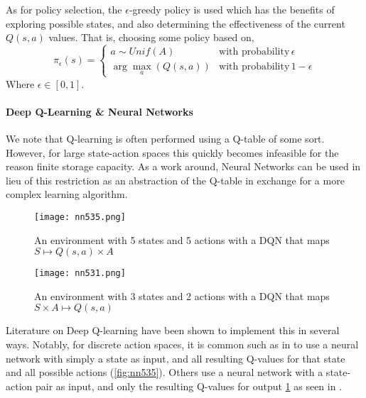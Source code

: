 \documentclass[../report.tex]{subfiles}
\begin{document}
As for policy selection, the $\epsilon$-greedy policy is used which has the benefits of exploring possible states, and also determining the effectiveness of the current $Q(s,a)$ values. That is, choosing some policy based on,
\begin{equation}\label{eq:epsilon-greedy}
    \pi_\epsilon(s)=
    \begin{cases}
        a \sim Unif(A)      & \text{with probability}\, \epsilon \\ 
        \arg\max\limits_{a}(Q(s,a))         & \text{with probability} \, 1-\epsilon
    \end{cases}
\end{equation}
Where $\epsilon\in[0,1]$.

\paragraph{Deep Q-Learning \& Neural Networks}
We note that Q-learning is often performed using a Q-table of some sort. However, for large state-action spaces this quickly becomes infeasible for the reason finite storage capacity. As a work around, Neural Networks can be used in lieu of this restriction as an abstraction of the Q-table in exchange for a more complex learning algorithm.

\begin{figure}
    \centering
    \begin{minipage}{0.35\textwidth}\label{fig:nn535}
        \centering
        \texttt{[image: nn535.png]}
        \caption{An environment with 5 states and 5 actions with a DQN that maps $S \mapsto Q(s,a) \times A$ }
    \end{minipage}\hfill
    \begin{minipage}{0.35\textwidth}\label{fig:nn531}
        \centering
        \texttt{[image: nn531.png]}
        \caption{An environment with 3 states and 2 actions with a DQN that maps $S\times A \mapsto Q(s,a)$ }
    \end{minipage}
\end{figure}

Literature on Deep Q-learning have been shown to implement this in several ways. Notably, for discrete action spaces, it is common such as in \cite{ree13} to use a neural network with simply a state as input, and all resulting Q-values for that state and all possible actions (\ref{fig:nn535}). Others use a neural network with a state-action pair as input, and only the resulting Q-values for output \ref{fig:nn531} as seen in \cite{ank13}. 
\end{document}
